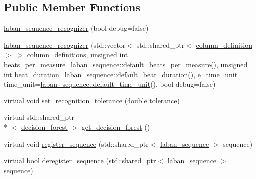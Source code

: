 \subsection*{Public Member Functions}
\begin{DoxyCompactItemize}
\item 
\hyperlink{classmae_1_1fl_1_1laban_1_1laban__sequence__recognizer_ac8bcf4bda67c74efb755aaac707def33}{laban\-\_\-sequence\-\_\-recognizer} (bool debug=false)
\item 
\hyperlink{classmae_1_1fl_1_1laban_1_1laban__sequence__recognizer_a74b400fd80ee4dd76588a0e938a6adc6}{laban\-\_\-sequence\-\_\-recognizer} (std\-::vector$<$ std\-::shared\-\_\-ptr$<$ \hyperlink{classmae_1_1fl_1_1laban_1_1column__definition}{column\-\_\-definition} $>$ $>$ column\-\_\-definitions, unsigned int beats\-\_\-per\-\_\-measure=\hyperlink{classmae_1_1fl_1_1laban_1_1laban__sequence_a2e64362d5cfeb89eb8545cb064e63170}{laban\-\_\-sequence\-::default\-\_\-beats\-\_\-per\-\_\-measure}(), unsigned int beat\-\_\-duration=\hyperlink{classmae_1_1fl_1_1laban_1_1laban__sequence_ac7bf04cdac0c3aed6b8ee4a887e561d9}{laban\-\_\-sequence\-::default\-\_\-beat\-\_\-duration}(), e\-\_\-time\-\_\-unit time\-\_\-unit=\hyperlink{classmae_1_1fl_1_1laban_1_1laban__sequence_ada28215d43d85e983fe6129e9816eed2}{laban\-\_\-sequence\-::default\-\_\-time\-\_\-unit}(), bool debug=false)
\item 
virtual void \hyperlink{classmae_1_1fl_1_1laban_1_1laban__sequence__recognizer_a2a6255ac083530269ca80a74c1b01a68}{set\-\_\-recognition\-\_\-tolerance} (double tolerance)
\item 
virtual std\-::shared\-\_\-ptr\\*
$<$ \hyperlink{classmae_1_1fl_1_1laban_1_1decision__forest}{decision\-\_\-forest} $>$ \hyperlink{classmae_1_1fl_1_1laban_1_1laban__sequence__recognizer_a3d4b0585fa58c25df6b6f70eff922cc2}{get\-\_\-decision\-\_\-forest} ()
\item 
virtual void \hyperlink{classmae_1_1fl_1_1laban_1_1laban__sequence__recognizer_a5275a3620709af2f4ff984382029a89e}{register\-\_\-sequence} (std\-::shared\-\_\-ptr$<$ \hyperlink{classmae_1_1fl_1_1laban_1_1laban__sequence}{laban\-\_\-sequence} $>$ sequence)
\item 
virtual bool \hyperlink{classmae_1_1fl_1_1laban_1_1laban__sequence__recognizer_a31410c5237b11f78e0ecdbc664157adf}{deregister\-\_\-sequence} (std\-::shared\-\_\-ptr$<$ \hyperlink{classmae_1_1fl_1_1laban_1_1laban__sequence}{laban\-\_\-sequence} $>$ sequence)
\item 

\end{DoxyCompactItemize}
